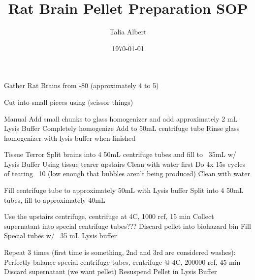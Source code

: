 \documentclass[12pt, letterpaper]{article}
\title{Rat Brain Pellet Preparation SOP}
\author{
    Talia Albert
}
\date{\today}
\begin{document}
\maketitle
\tableofcontents

Gather Rat Brains from -80 (approximately 4 to 5)

Cut into small pieces using (scissor things)

Manual
    Add small chunks to glass homogenizer and add approximately 2 mL Lysis Buffer
    Completely homogenize
    Add to 50mL centrifuge tube
    Rinse glass homogenizer with lysis buffer when finished

Tissue Terror
    Split brains into 4 50mL centrifuge tubes and fill to ~35mL w/ Lysis Buffer
    Using tissue tearer upstairs
        Clean with water first
        Do 4x 15s cycles of tearing ~10 (low enough that bubbles aren't being produced)
        Clean with water

Fill centrifuge tube to approximately 50mL with Lysis buffer
    Split into 4 50mL tubes, fill to approximately 40mL

Use the upstairs centrifuge, centrifuge at 4C, 1000 rcf, 15 min
    Collect supernatant into special centrifuge tubes??? 
    Discard pellet into biohazard bin
    Fill Special tubes w/ ~35 mL Lysis buffer

Repeat 3 times (first time is something, 2nd and 3rd are considered washes):
    Perfectly balance special centrifuge tubes, centrifuge @ 4C, 200000 rcf, 45 min
        Discard supernatant (we want pellet)
        Resuspend Pellet in Lysis Buffer
\end{document}
